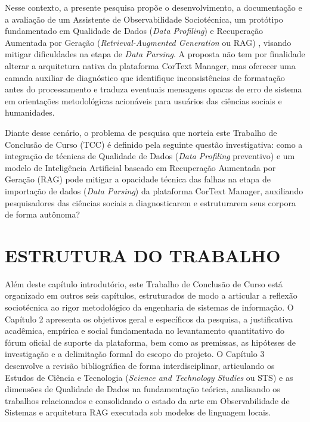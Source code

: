 \documentclass[
	oneside,
	a4paper,
	12pt,
	chapter=TITLE,
	section=TITLE,
	english,
	brazilian
]{abntex2}
\begin{document}
Nesse contexto, a presente pesquisa propõe o desenvolvimento, a documentação e a avaliação de um Assistente de Observabilidade Sociotécnica, um protótipo fundamentado em Qualidade de Dados (\textit{Data Profiling}) \cite{Wang1996,Naumann2014} e Recuperação Aumentada por Geração (\textit{Retrieval-Augmented Generation} ou RAG) \cite{Lewis2020}, visando mitigar dificuldades na etapa de \textit{Data Parsing}. A proposta não tem por finalidade alterar a arquitetura nativa da plataforma CorText Manager, mas oferecer uma camada auxiliar de diagnóstico que identifique inconsistências de formatação antes do processamento e traduza eventuais mensagens opacas de erro de sistema em orientações metodológicas acionáveis para usuários das ciências sociais e humanidades.

Diante desse cenário, o problema de pesquisa que norteia este Trabalho de Conclusão de Curso (TCC) é definido pela seguinte questão investigativa: como a integração de técnicas de Qualidade de Dados (\textit{Data Profiling} preventivo) e um modelo de Inteligência Artificial baseado em Recuperação Aumentada por Geração (RAG) pode mitigar a opacidade técnica das falhas na etapa de importação de dados (\textit{Data Parsing}) da plataforma CorText Manager, auxiliando pesquisadores das ciências sociais a diagnosticarem e estruturarem seus corpora de forma autônoma?

\FloatBarrier
\section{ESTRUTURA DO TRABALHO}\label{sec:estrutura_do_trabalho}


Além deste capítulo introdutório, este Trabalho de Conclusão de Curso está organizado em outros seis capítulos, estruturados de modo a articular a reflexão sociotécnica ao rigor metodológico da engenharia de sistemas de informação. O Capítulo 2 apresenta os objetivos geral e específicos da pesquisa, a justificativa acadêmica, empírica e social fundamentada no levantamento quantitativo do fórum oficial de suporte da plataforma, bem como as premissas, as hipóteses de investigação e a delimitação formal do escopo do projeto. O Capítulo 3 desenvolve a revisão bibliográfica de forma interdisciplinar, articulando os Estudos de Ciência e Tecnologia (\textit{Science and Technology Studies} ou STS) e as dimensões de Qualidade de Dados na fundamentação teórica, analisando os trabalhos relacionados e consolidando o estado da arte em Observabilidade de Sistemas e arquitetura RAG executada sob modelos de linguagem locais.
\end{document}
